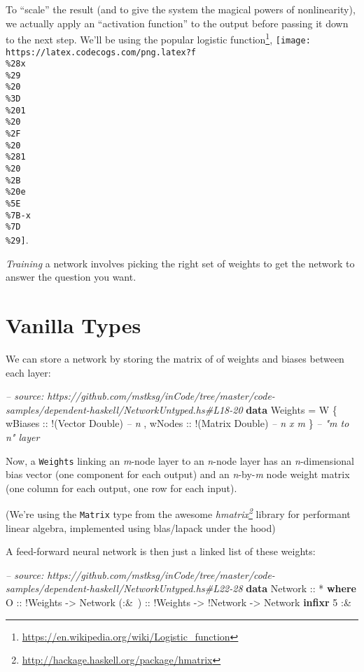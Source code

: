 \documentclass[]{article}
\newenvironment{Shaded}{}{}
\newcommand{\KeywordTok}[1]{\textcolor[rgb]{0.00,0.44,0.13}{\textbf{#1}}}
\newcommand{\DataTypeTok}[1]{\textcolor[rgb]{0.56,0.13,0.00}{#1}}
\newcommand{\DecValTok}[1]{\textcolor[rgb]{0.25,0.63,0.44}{#1}}
\newcommand{\CommentTok}[1]{\textcolor[rgb]{0.38,0.63,0.69}{\textit{#1}}}
\newcommand{\OtherTok}[1]{\textcolor[rgb]{0.00,0.44,0.13}{#1}}
\newcommand{\FunctionTok}[1]{\textcolor[rgb]{0.02,0.16,0.49}{#1}}
\newcommand{\NormalTok}[1]{#1}
\renewcommand{\href}[2]{#2\footnote{\url{#1}}}
\begin{document}
To ``scale'' the result (and to give the system the magical powers of
nonlinearity), we actually apply an ``activation function'' to the output before
passing it down to the next step. We'll be using the popular
\href{https://en.wikipedia.org/wiki/Logistic_function}{logistic function},
\texttt{[image: https://latex.codecogs.com/png.latex?f\\\%28x\\\%29\\\%20\\\%3D\\\%201\\\%20\\\%2F\\\%20\\\%281\\\%20\\\%2B\\\%20e\\\%5E\\\%7B-x\\\%7D\\\%29]}.

\emph{Training} a network involves picking the right set of weights to get the
network to answer the question you want.

\section{Vanilla Types}\label{vanilla-types}

We can store a network by storing the matrix of of weights and biases between
each layer:

\begin{Shaded}
\begin{Highlighting}[]
\CommentTok{-- source: https://github.com/mstksg/inCode/tree/master/code-samples/dependent-haskell/NetworkUntyped.hs#L18-20}
\KeywordTok{data} \DataTypeTok{Weights} \FunctionTok{=} \DataTypeTok{W}\NormalTok{ \{}\OtherTok{ wBiases ::} \FunctionTok{!}\NormalTok{(}\DataTypeTok{Vector} \DataTypeTok{Double}\NormalTok{)  }\CommentTok{-- n}
\NormalTok{                 ,}\OtherTok{ wNodes  ::} \FunctionTok{!}\NormalTok{(}\DataTypeTok{Matrix} \DataTypeTok{Double}\NormalTok{)  }\CommentTok{-- n x m}
\NormalTok{                 \}                              }\CommentTok{-- "m to n" layer}
\end{Highlighting}
\end{Shaded}

Now, a \texttt{Weights} linking an \emph{m}-node layer to an \emph{n}-node layer
has an \emph{n}-dimensional bias vector (one component for each output) and an
\emph{n}-by-\emph{m} node weight matrix (one column for each output, one row for
each input).

(We're using the \texttt{Matrix} type from the awesome
\emph{\href{http://hackage.haskell.org/package/hmatrix}{hmatrix}} library for
performant linear algebra, implemented using blas/lapack under the hood)

A feed-forward neural network is then just a linked list of these weights:

\begin{Shaded}
\begin{Highlighting}[]
\CommentTok{-- source: https://github.com/mstksg/inCode/tree/master/code-samples/dependent-haskell/NetworkUntyped.hs#L22-28}
\KeywordTok{data} \DataTypeTok{Network}\OtherTok{ ::} \FunctionTok{*} \KeywordTok{where}
    \DataTypeTok{O}\OtherTok{     ::} \FunctionTok{!}\DataTypeTok{Weights}
          \OtherTok{->} \DataTypeTok{Network}
\OtherTok{    (:&~) ::} \FunctionTok{!}\DataTypeTok{Weights}
          \OtherTok{->} \FunctionTok{!}\DataTypeTok{Network}
          \OtherTok{->} \DataTypeTok{Network}
\KeywordTok{infixr} \DecValTok{5} \FunctionTok{:&~}
\end{Highlighting}
\end{Shaded}
\end{document}
